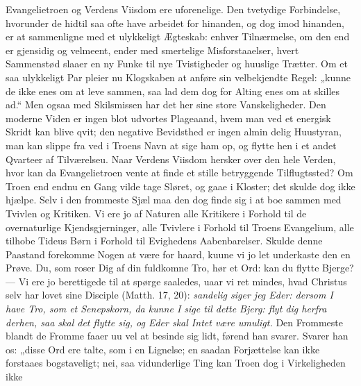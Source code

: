 \documentclass[12pt,a4paper]{book}
\begin{document}
Evangelietroen og Verdens Viisdom ere uforenelige. Den tvetydige Forbindelse, hvorunder
de hidtil saa ofte have arbeidet for hinanden, og dog imod hinanden, er at sammenligne
med et ulykkeligt Ægteskab: enhver Tilnærmelse, om den end er gjensidig og velmeent,
ender med smertelige Misforstaaelser, hvert Sammenstød slaaer en ny Funke til nye
Tvistigheder og huuslige Trætter. Om et saa ulykkeligt Par pleier nu Klogskaben at
anføre sin velbekjendte Regel: „kunne de ikke enes om at leve sammen, saa lad dem dog
for Alting enes om at skilles ad.“ Men ogsaa med Skilsmissen har det her sine store
Vanskeligheder. Den moderne Viden er ingen blot udvortes Plageaand, hvem man ved et
energisk Skridt kan blive qvit; den negative Bevidsthed er ingen almin\-%
delig Huustyran, man kan slippe fra ved i Troens Navn at sige ham op, og flytte hen i et
andet Qvarteer af Tilværelseu. Naar Verdens Viisdom hersker over den hele Verden, hvor
kan da Evangelietroen vente at finde et stille betryggende Tilflugtssted? Om Troen end
endnu en Gang vilde tage Sløret, og gaae i Kloster; det skulde dog ikke hjælpe. Selv i
den frommeste Sjæl maa den dog finde sig i at boe sammen med Tvivlen og Kritiken. Vi ere
jo af Naturen alle Kritikere i Forhold til de overnaturlige Kjendsgjerninger, alle
Tvivlere i Forhold til Troens Evangelium, alle tilhobe Tideus Børn i Forhold til
Evighedens Aabenbarelser. Skulde denne Paastand forekomme Nogen at være for haard, kuune
vi jo let underkaste den en Prøve. Du, som roser Dig af din fuldkomne Tro, hør et Ord:
kan du flytte Bjerge? --- Vi ere jo berettigede til at spørge saaledes, uaar vi ret
mindes, hvad Christus selv har lovet sine Disciple (Matth. 17, 20): \emph{sandelig siger
jeg Eder: dersom I have Tro, som et Senepskorn, da kunne I sige til dette Bjerg: flyt
dig herfra derhen, saa skal det flytte sig, og Eder skal Intet være umuligt.} Den
Frommeste blandt de Fromme faaer uu vel at besinde sig lidt, førend han svarer. Svarer
han os: „disse Ord ere talte, som i en Lignelse; en saadan Forjættelse kan ikke
forstaaes bogstaveligt; nei, saa vidunderlige Ting kan Troen dog i Virkeligheden ikke
\end{document}
